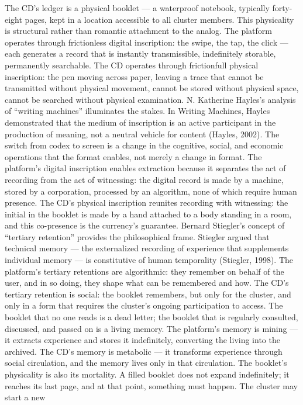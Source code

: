 The CD’s ledger is a physical booklet — a waterproof notebook, typically forty-eight pages, kept in a location accessible to all cluster members. This physicality is structural rather than romantic attachment to the analog. The platform operates through frictionless digital inscription: the swipe, the tap, the click — each generates a record that is instantly transmissible, indefinitely storable, permanently searchable. The CD operates through frictionfull physical inscription: the pen moving across paper, leaving a trace that cannot be transmitted without physical movement, cannot be stored without physical space, cannot be searched without physical examination. N. Katherine Hayles’s analysis of “writing machines” illuminates the stakes. In Writing Machines, Hayles demonstrated that the medium of inscription is an active participant in the production of meaning, not a neutral vehicle for content (Hayles, 2002). The switch from codex to screen is a change in the cognitive, social, and economic operations that the format enables, not merely a change in format. The platform’s digital inscription enables extraction because it separates the act of recording from the act of witnessing: the digital record is made by a machine, stored by a corporation, processed by an algorithm, none of which require human presence. The CD’s physical inscription reunites recording with witnessing: the initial in the booklet is made by a hand attached to a body standing in a room, and this co-presence is the currency’s guarantee. Bernard Stiegler’s concept of “tertiary retention” provides the philosophical frame. Stiegler argued that technical memory — the externalized recording of experience that supplements individual memory — is constitutive of human temporality (Stiegler, 1998). The platform’s tertiary retentions are algorithmic: they remember on behalf of the user, and in so doing, they shape what can be remembered and how. The CD’s tertiary retention is social: the booklet remembers, but only for the cluster, and only in a form that requires the cluster’s ongoing participation to access. The booklet that no one reads is a dead letter; the booklet that is regularly consulted, discussed, and passed on is a living memory. The platform’s memory is mining — it extracts experience and stores it indefinitely, converting the living into the archived. The CD’s memory is metabolic — it transforms experience through social circulation, and the memory lives only in that circulation. The booklet’s physicality is also its mortality. A filled booklet does not expand indefinitely; it reaches its last page, and at that point, something must happen. The cluster may start a new

